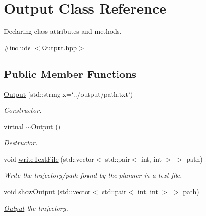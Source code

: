 \hypertarget{classOutput}{}\section{Output Class Reference}
\label{classOutput}


Declaring class attributes and methods.  




{\ttfamily \#include $<$Output.\+hpp$>$}

\subsection*{Public Member Functions}
\begin{DoxyCompactItemize}
\item 
\mbox{\label{classOutput_ae44251217677b4799cfec41d57da48fc}} 
\mbox{\hyperlink{classOutput_ae44251217677b4799cfec41d57da48fc}{Output}} (std\+::string x=\char`\"{}../output/path.\+txt\char`\"{})
\begin{DoxyCompactList}\small\item\em Constructor. \end{DoxyCompactList}\item 
\mbox{\label{classOutput_a61d0840daf98bea49e4dc471f235eeab}} 
virtual \mbox{\hyperlink{classOutput_a61d0840daf98bea49e4dc471f235eeab}{$\sim$\+Output}} ()
\begin{DoxyCompactList}\small\item\em Destructor. \end{DoxyCompactList}\item 
void \mbox{\hyperlink{classOutput_a20cb54a07125bf00008407b9435af331}{write\+Text\+File}} (std\+::vector$<$ std\+::pair$<$ int, int $>$ $>$ path)
\begin{DoxyCompactList}\small\item\em Write the trajectory/path found by the planner in a text file. \end{DoxyCompactList}\item 
void \mbox{\hyperlink{classOutput_af2c30cc4a32305648f5a00435250c80a}{show\+Output}} (std\+::vector$<$ std\+::pair$<$ int, int $>$ $>$ path)
\begin{DoxyCompactList}\small\item\em \mbox{\hyperlink{classOutput}{Output}} the trajectory. \end{DoxyCompactList}\end{DoxyCompactItemize}
